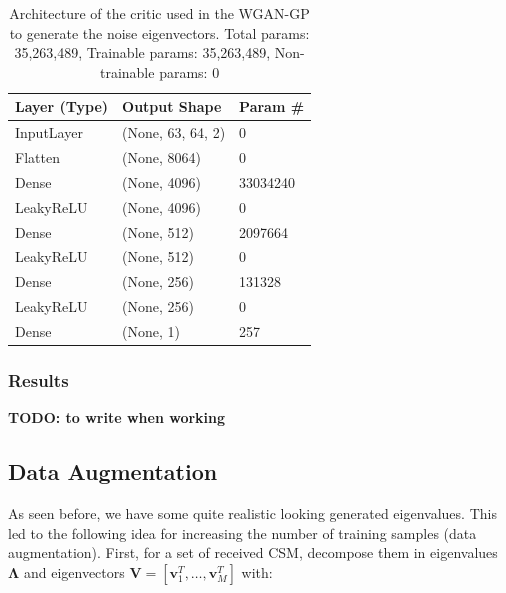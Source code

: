 \documentclass{article}
\begin{document}
\begin{table}[]
    \begin{tabular}{|l|l|l|}
        \hline
        \textbf{Layer (Type)} & \textbf{Output Shape} & \textbf{Param \#} \\ \hline
        InputLayer            & (None, 63, 64, 2)     & 0                 \\ \hline
        Flatten               & (None, 8064)          & 0                 \\ \hline
        Dense                 & (None, 4096)          & 33034240          \\ \hline
        LeakyReLU             & (None, 4096)          & 0                 \\ \hline
        Dense                 & (None, 512)           & 2097664           \\ \hline
        LeakyReLU             & (None, 512)           & 0                 \\ \hline
        Dense                 & (None, 256)           & 131328            \\ \hline
        LeakyReLU             & (None, 256)           & 0                 \\ \hline
        Dense                 & (None, 1)             & 257               \\ \hline
        \end{tabular}
    \caption{Architecture of the critic used in the WGAN-GP to generate the noise eigenvectors. Total params: 35,263,489, Trainable params: 35,263,489, Non-trainable params: 0}
    \label{tab:noise_evecs_critic_WGANGP_architecture}
\end{table}

\subsubsection{Results}

\textbf{TODO: to write when working}

\subsection{Data Augmentation}

As seen before, we have some quite realistic looking generated eigenvalues. This led to the following idea for increasing the number of training samples (data augmentation). First, for a set of received CSM, decompose them in eigenvalues $\mathbf{\Lambda}$  and eigenvectors $\mathbf{V} = [\mathbf{v}_1^T, \dots, \mathbf{v}_M^T]$ with:
\end{document}
